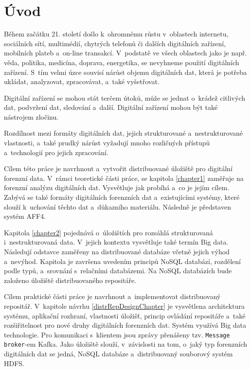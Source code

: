 

\chapter{Úvod}
Během začátku 21. století došlo k~ohromnému růstu v~oblastech internetu, sociálních sítí, multimédií, chytrých telefonů či dalších digitálních zařízení, mobilních plateb a~on-line transakcí. V~podstatě ve všech oblastech jako je např. věda, politika, medicína, doprava, energetika, se nevyhneme použití digitálních zařízení. S~tím velmi úzce souvisí nárůst objemu digitálních dat, která je potřeba ukládat, analyzovat, zpracovávat, a~také vyšetřovat.

Digitální zařízení se mohou stát terčem útoků, může se jednat o~krádež citlivých dat, podvržení dat, sledování a~další. Digitální zařízení mohou být také nástrojem zločinu.

Rozdílnost mezi formáty digitálních dat, jejich strukturované a~nestrukturované vlastnosti, a~také prudký nárůst vyžadují mnoho rozličných přístupů a~technologií pro jejich zpracování.

Cílem této práce je navrhnout a~vytvořit distribuované úložiště pro digitální forenzní data. V~rámci teoretické části práce, se kapitola \ref{chapter1} zaměřuje na forenzní analýzu digitálních dat. Vysvětluje jak probíhá a~co je jejím cílem. Zabývá se také formáty digitálních forenzních dat a~existujícími systémy, které slouží k~uchování těchto dat a~důkazního materiálu. Následně je představen systém AFF4.

Kapitola \ref{chapter2} pojednává o~úložištích pro rozsáhlá strukturovaná i~nestrukturovaná data. V~jejich kontextu vysvětluje také termín Big data. Následují odstavce zaměřeny na distribuované databáze včetně jejich výhod a~nevýhod. Kapitola je završena uvedením principů NoSQL databází, rozdělení podle typů, a~srovnání s~relačními databázemi. Na NoSQL databázích bude založeno úložiště distribuovaného repositáře.

Cílem praktické části práce je navrhnout a~implementovat distribuovaný repositář. V~kapitole návrhu \ref{distrRepDesignChapter} je vysvětlena architektura systému, aplikační rozhraní, vlastnosti úložišť, princip ovládání repositáře a~také rozšiřitelnost pro nové druhy digitálních forenzních dat. Systém využívá Big data technologie. Pro komunikaci s~klientem jsou zprávy přenášeny tzv. \texttt{Message broker}-em Kafka. Jako úložiště slouží, v~závislosti na tom, o~jaký typ forenzních digitálních dat se jedná, NoSQL databáze a~distribuovaný souborový systém HDFS.

